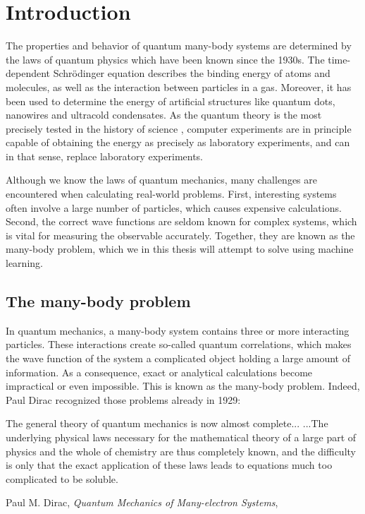 \chapter{Introduction}
The properties and behavior of quantum many-body systems are determined by the laws of quantum physics which have been known since the 1930s. The time-dependent Schrödinger equation describes the binding energy of atoms and molecules, as well as the interaction between particles in a gas. Moreover, it has been used to determine the energy of artificial structures like quantum dots, nanowires and ultracold condensates. As the quantum theory is the most precisely tested in the history of science \cite{odom_new_2006}, computer experiments are in principle capable of obtaining the energy as precisely as laboratory experiments, and can in that sense, replace laboratory experiments.

Although we know the laws of quantum mechanics, many challenges are encountered when calculating real-world problems. First, interesting systems often involve a large number of particles, which causes expensive calculations. Second, the correct wave functions are seldom known for complex systems, which is vital for measuring the observable accurately. Together, they are known as the many-body problem, which we in this thesis will attempt to solve using machine learning.

\section{The many-body problem}
In quantum mechanics, a many-body system contains three or more interacting particles. These interactions create so-called quantum correlations, which makes the wave function of the system a complicated object holding a large amount of information. As a consequence, exact or analytical calculations become impractical or even impossible. This is known as the many-body problem. Indeed, Paul Dirac recognized those problems already in 1929:

\begin{shadequote}{
		The general theory of quantum mechanics is now almost complete... ...The underlying physical laws necessary for the mathematical theory of a large part of physics and the whole of chemistry are thus completely known, and the difficulty is only that the exact application of these laws leads to equations much too complicated to be soluble. \par Paul M. Dirac, \emph{Quantum Mechanics of Many-electron Systems}, \cite{dirac_paul_adrien_maurice_quantum_1929}}
\end{shadequote}

